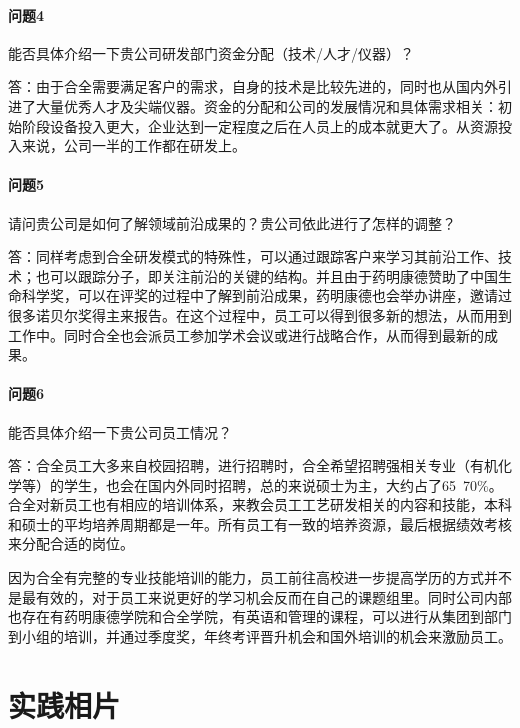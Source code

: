 \documentclass[twocolumn,openany]{ctexbook}
\begin{document}
	\paragraph{问题4}能否具体介绍一下贵公司研发部门资金分配（技术/人才/仪器）？
	
	答：由于合全需要满足客户的需求，自身的技术是比较先进的，同时也从国内外引进了大量优秀人才及尖端仪器。资金的分配和公司的发展情况和具体需求相关：初始阶段设备投入更大，企业达到一定程度之后在人员上的成本就更大了。从资源投入来说，公司一半的工作都在研发上。
	
	\paragraph{问题5}请问贵公司是如何了解领域前沿成果的？贵公司依此进行了怎样的调整？
	
	答：同样考虑到合全研发模式的特殊性，可以通过跟踪客户来学习其前沿工作、技术；也可以跟踪分子，即关注前沿的关键的结构。并且由于药明康德赞助了中国生命科学奖，可以在评奖的过程中了解到前沿成果，药明康德也会举办讲座，邀请过很多诺贝尔奖得主来报告。在这个过程中，员工可以得到很多新的想法，从而用到工作中。同时合全也会派员工参加学术会议或进行战略合作，从而得到最新的成果。
	
	\paragraph{问题6}能否具体介绍一下贵公司员工情况？
	
	答：合全员工大多来自校园招聘，进行招聘时，合全希望招聘强相关专业（有机化学等）的学生，也会在国内外同时招聘，总的来说硕士为主，大约占了65~70\%。合全对新员工也有相应的培训体系，来教会员工工艺研发相关的内容和技能，本科和硕士的平均培养周期都是一年。所有员工有一致的培养资源，最后根据绩效考核来分配合适的岗位。
	
	因为合全有完整的专业技能培训的能力，员工前往高校进一步提高学历的方式并不是最有效的，对于员工来说更好的学习机会反而在自己的课题组里。同时公司内部也存在有药明康德学院和合全学院，有英语和管理的课程，可以进行从集团到部门到小组的培训，并通过季度奖，年终考评晋升机会和国外培训的机会来激励员工。
	
	
	\newpage
	
	\section*{实践相片}
	
\end{document}
